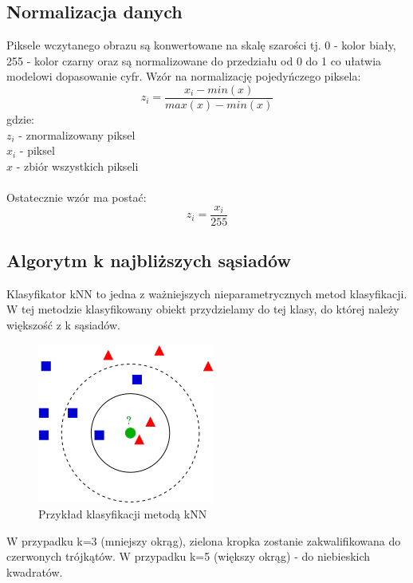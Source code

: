 \documentclass[12pt,a4paper]{article}
\begin{document}
\subsection{Normalizacja danych}
Piksele wczytanego obrazu są konwertowane na skalę szarości tj. 0 - kolor biały, 255 - kolor czarny
oraz są normalizowane do przedziału od 0 do 1 co ułatwia modelowi dopasowanie cyfr.
Wzór na normalizację pojedyńczego piksela:
\[
	z_i=\frac{x_i - min(x)}{max(x) - min(x)}
\]
gdzie: \\
\indent $z_i$ - znormalizowany piksel\\
\indent $x_i$ - piksel\\
\indent $x$ - zbiór wszystkich pikseli\\~\\
Ostatecznie wzór ma postać:
\[
	z_i=\frac{x_i}{255}
\]
\subsection{Algorytm k najbliższych sąsiadów}
Klasyfikator kNN to jedna z ważniejszych nieparametrycznych metod klasyfikacji. W tej metodzie
klasyfikowany obiekt przydzielamy do tej klasy, do której należy większość z k sąsiadów.
\begin{figure}[!h]
	\includegraphics{"KnnClassification.png"}
	\centering
	\caption{Przykład klasyfikacji metodą kNN}
\end{figure}

W przypadku k=3 (mniejszy okrąg), zielona kropka zostanie zakwalifikowana do czerwonych
trójkątów. W przypadku k=5 (większy okrąg) - do niebieskich kwadratów.

\end{document}
